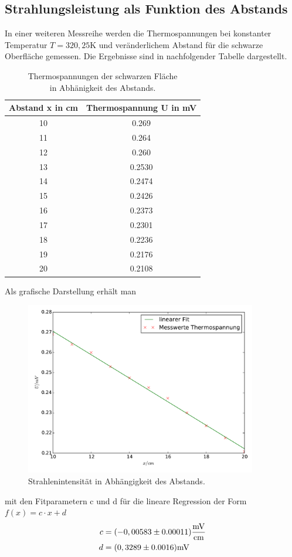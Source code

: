 \subsection{Strahlungsleistung als Funktion des Abstands}
In einer weiteren Messreihe werden die Thermospannungen bei konstanter Temperatur
$T=320,25\si{\kelvin}$ und veränderlichem Abstand für die schwarze Oberfläche
gemessen. Die Ergebnisse sind in nachfolgender Tabelle dargestellt.
\begin{table}
  \centering
  \begin{tabular}{c c}
    \toprule
    Abstand x in cm & Thermospannung U in \si{\milli\volt}\\
    \midrule
    10 & 0.269  \\
    11 & 0.264  \\
    12 & 0.260  \\
    13 & 0.2530 \\
    14 & 0.2474 \\
    15 & 0.2426 \\
    16 & 0.2373 \\
    17 & 0.2301 \\
    18 & 0.2236 \\
    19 & 0.2176 \\
    20 & 0.2108 \\
    \bottomrule
  \end{tabular}
 \caption{Thermospannungen der schwarzen Fläche\\in Abhänigkeit des Abstands.}
\end{table}
\newpage
Als grafische Darstellung erhält man
\begin{figure}

  \includegraphics[width=0.9\textwidth]{strahlintensitaet.pdf}
  \caption{Strahlenintensität in Abhängigkeit des Abstands.}
  \label{fig:strahlintensitaet}
\end{figure}
mit den Fitparametern c und d für die lineare Regression der Form $f(x) = c \cdot x + d $
\begin{align*}
  c &= (-0,00583\pm0.00011) \si{\frac{\milli\volt}{\centi\meter}} \\
  d &= (0,3289\pm0.0016) \si{\milli\volt}
\end{align*}
